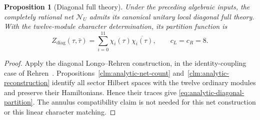 \documentclass[11pt,a4paper]{article}
\newtheorem{proposition}[theorem]{Proposition}
\theoremstyle{definition}
\begin{document}
\begin{proposition}[Diagonal full theory]
\label{prop:analytic-diagonal}
Under the preceding algebraic inputs, the completely rational net
$\mathcal N_U$ admits its canonical unitary local diagonal full theory.
With the twelve-module character determination, its partition function is
\begin{equation}
 Z_{\mathrm{diag}}(\tau,\bar\tau)
   =\sum_{i=0}^{11}\chi_i(\tau)\overline{\chi_i(\tau)},
 \qquad c_L=c_R=8.
 \label{eq:analytic-diagonal-partition}
\end{equation}
\end{proposition}
\begin{proof}
Apply the diagonal Longo--Rehren construction, in the identity-coupling
case of
Rehren~\cite[Theorem~1.4, Proposition~1.5, and Corollary~1.6]{Rehren}.
Propositions~\ref{clm:analytic-net-count} and~\ref{clm:analytic-reconstruction}
identify all sector Hilbert spaces with the twelve ordinary
modules and preserve their Hamiltonians.  Hence their traces give
\eqref{eq:analytic-diagonal-partition}.  The annulus compatibility claim
is not needed for this net construction or this linear character matching.
\end{proof}
\end{document}
